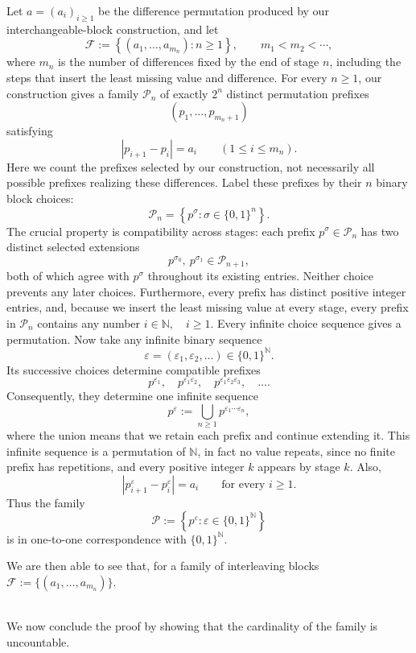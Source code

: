 \documentclass[11pt,a4paper]{article}
\theoremstyle{definition}
\theoremstyle{remark}
\numberwithin{equation}{section}
\begin{document}
Let \(a=(a_i)_{i\ge1}\) be the difference permutation produced by our interchangeable-block construction, and let
\[
\mathcal F:=\left\{(a_1,\ldots,a_{m_n}):n\ge1\right\},
\qquad m_1<m_2<\cdots,
\]
where \(m_n\) is the number of differences fixed by the end of stage \(n\), including the steps that insert the least missing value and difference.
For every \(n\ge1\), our construction gives a family \(\mathcal P_n\) of exactly \(2^n\) distinct permutation prefixes
\[
(p_1,\ldots,p_{m_n+1})
\]
satisfying
\[
|p_{i+1}-p_i|=a_i
\qquad(1\le i\le m_n).
\]
Here we count the prefixes selected by our construction, not necessarily all possible prefixes realizing these differences.
Label these prefixes by their \(n\) binary block choices:
\[
\mathcal P_n
=
\left\{p^\sigma:\sigma\in\{0,1\}^n\right\}.
\]
The crucial property is compatibility across stages: each prefix \(p^\sigma\in\mathcal P_n\) has two distinct selected extensions
\[
p^{\sigma_0},\ p^{\sigma_1}\in\mathcal P_{n+1},
\]
both of which agree with \(p^\sigma\) throughout its existing entries. Neither choice prevents any later choices.
Furthermore, every prefix has distinct positive integer entries, and, because we insert the least missing value at every stage, every prefix in \(\mathcal P_n\) contains any number $i \in \mathbb N,\quad  i\ge1$.
Every infinite choice sequence gives a permutation. 
Now take any infinite binary sequence
\[
\varepsilon=(\varepsilon_1,\varepsilon_2,\ldots)\in\{0,1\}^{\mathbb N}.
\]
Its successive choices determine compatible prefixes
\[
p^{\varepsilon_1},\quad
p^{\varepsilon_1\varepsilon_2},\quad
p^{\varepsilon_1\varepsilon_2\varepsilon_3},\quad\ldots.
\]
Consequently, they determine one infinite sequence
\[
p^\varepsilon
:=
\bigcup_{n\ge1}p^{\varepsilon_1\cdots\varepsilon_n},
\]
where the union means that we retain each prefix and continue extending it.
This infinite sequence is a permutation of \(\mathbb N\), in fact no value repeats, since no finite prefix has repetitions, and every positive integer \(k\) appears by stage \(k\). Also,
\[
|p^\varepsilon_{i+1}-p^\varepsilon_i|=a_i
\qquad\text{for every }i\ge1.
\]
Thus the family
\[
\mathcal P:=\left\{p^\varepsilon:
\varepsilon\in\{0,1\}^{\mathbb N}\right\}
\]
is in one-to-one correspondence with \(\{0,1\}^{\mathbb N}\).

We are then able to see that, for a family of interleaving blocks $\mathcal F:=\{(a_1,\ldots,a_{m_n})\}$. 

\\
We now conclude the proof by showing that the cardinality of the family is uncountable.
\end{document}
